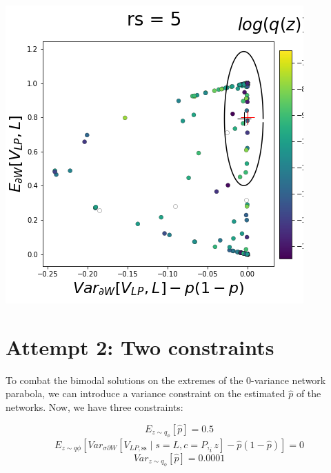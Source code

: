 \documentclass[11pt]{article}
\begin{document}
\begin{center}
\includegraphics[scale=0.33]{figs/T_x_SC_full_c=0_p=80_rs=5.png}
\end{center}

\section{Attempt 2: Two constraints}
To combat the bimodal solutions on the extremes of the 0-variance network parabola, we can introduce a variance constraint on the estimated $\hat{p}$ of the networks.  Now, we have three constraints: 

\[E_{z \sim q_\phi} \left[ \hat{p} \right] = 0.5\]
\[E_{z \sim q\phi} \left[ Var_{\sigma \partial W} \left[ V_{LP,\text{ss}} \mid s=L, c=P, _iz \right] - \hat{p}(1 - \hat{p}) \right] = 0\]
\[Var_{z \sim q_\phi} \left[ \hat{p} \right] = 0.0001\]
\end{document}
